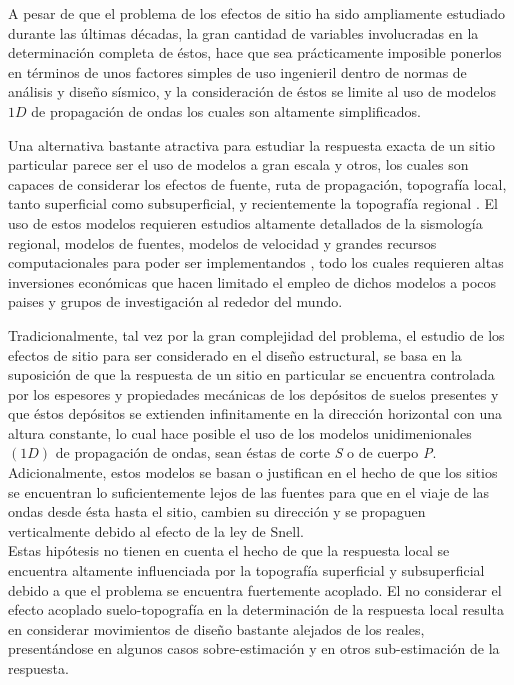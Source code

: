 \documentclass[spanish,letterpaper,12pt,twoside,openany]{article}
\begin{document}
A pesar de que el problema de los efectos de sitio ha sido ampliamente estudiado durante las últimas décadas, la gran cantidad de variables involucradas en la determinación completa de éstos, hace que sea prácticamente imposible ponerlos en términos de unos factores simples de uso ingenieril dentro de normas de análisis y diseño sísmico, y la consideración de éstos se limite al uso de modelos $1D$ de propagación de ondas los cuales son altamente simplificados.

Una alternativa bastante atractiva para estudiar la respuesta exacta de un sitio particular parece ser el uso de modelos a gran escala \citep[por ejemplo][]{Bielak2005, Lee2009a, Lee2009b, Ma2007} y otros, los cuales son capaces de considerar los efectos de fuente, ruta de propagación, topografía local, tanto superficial como subsuperficial, y recientemente la topografía regional \citep{Doriam2014}. El uso de estos modelos requieren estudios altamente detallados de la sismología regional, modelos de fuentes, modelos de velocidad y grandes recursos computacionales para poder ser implementandos \citep{Graves2011}, todo los cuales requieren altas inversiones económicas que hacen limitado el empleo de dichos modelos a pocos paises y grupos de investigación al rededor del mundo.

Tradicionalmente, tal vez por la gran complejidad del problema, el estudio de los efectos de sitio para ser considerado en el diseño estructural, se basa en la suposición de que la respuesta de un sitio en particular se encuentra controlada por los espesores y propiedades mecánicas de los depósitos de suelos presentes y que éstos depósitos se extienden infinitamente en la dirección horizontal con una altura constante, lo cual hace posible el uso de los modelos unidimenionales $\left( 1D \right)$ de propagación de ondas, sean éstas de corte \textit{S} o de cuerpo \textit{P}. Adicionalmente, estos modelos se basan o justifican en el hecho de que los sitios se encuentran lo suficientemente lejos de las fuentes para que en el viaje de las ondas desde ésta hasta el sitio, cambien su dirección y se propaguen verticalmente debido al efecto de la ley de Snell.\\
%
Estas hipótesis no tienen en cuenta el hecho de que la respuesta local se encuentra altamente influenciada por la topografía superficial y subsuperficial debido a que el problema se encuentra fuertemente acoplado. El no considerar el efecto acoplado suelo-topografía en la determinación de la respuesta local resulta en considerar movimientos de diseño bastante alejados de los reales, presentándose en algunos casos sobre-estimación y en otros sub-estimación de la respuesta.
\end{document}
